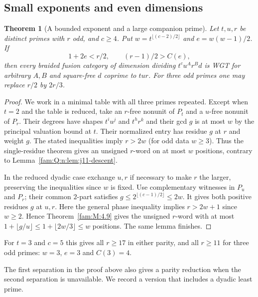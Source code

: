\documentclass[11pt,a4paper]{article}
\numberwithin{equation}{section}
\newtheorem{theorem}{Theorem}[section]
\theoremstyle{remark}
\begin{document}
\subsection{Small exponents and even dimensions}\label{fam:Q:sec:4}\label{fam:Q:n:sec:small}
\begin{theorem}[A bounded exponent and a large companion prime]\label{fam:Q:4.1}\label{fam:Q:n:quart:five}
Let $t,u,r$ be distinct primes with $r$ odd, and $c\ge4$. Put
$w=t^{\lfloor(c-2)/2\rfloor}$ and $e=w(w-1)/2$. If
\[
  1+2e<r/2,\qquad (r-1)/2>C(e),
\]
then every braided fusion category of dimension dividing
$t^c u^A r^B d$ is WGT for arbitrary $A,B$ and square-free $d$ coprime to $tur$. For three odd primes one may replace $r/2$
by $2r/3$.
\end{theorem}
\begin{proof}
We work in a minimal table with all three primes repeated.
Except when $t=2$ and the table is reduced, take an $r$-free
nonunit of $P_t$ and a $u$-free nonunit of $P_r$.
Their degrees have shapes $t^i u^j$ and $t^h r^k$ and their gcd
$g$ is at most $w$ by the principal valuation bound at $t$.
Their normalized entry has residue $g$ at $r$ and weight $g$.
The stated inequalities imply $r>2w$ (for odd data $w\ge3$).
Thus the single-residue theorem gives an unsigned $r$-word
on at most $w$ positions, contrary to Lemma~\ref{fam:Q:n:lem:j11-descent}.

In the reduced dyadic case exchange $u,r$ if necessary to make
$r$ the larger, preserving the inequalities since $w$ is fixed.
Use complementary witnesses in $P_u$ and $P_r$; their common
$2$-part satisfies $g\le2^{\lfloor(c-1)/2\rfloor}\le2w$.
It gives both positive residues $g$ at $u,r$. Here the general
phase inequality implies $r>2w+1$ since $w\ge2$. Hence
Theorem~\ref{fam:M:4.9} gives the unsigned $r$-word with at
most $1+\lfloor g/u\rfloor\le 1+\lfloor 2w/3\rfloor\le w$
positions. The same lemma finishes.
\end{proof}

For $t=3$ and $c=5$ this gives all $r\ge17$ in either parity,
and all $r\ge11$ for three odd primes: $w=3$, $e=3$ and $C(3)=4$.

The first separation in the proof above also gives a parity reduction
when the second separation is unavailable. We record a version that
includes a dyadic least prime.
\end{document}
